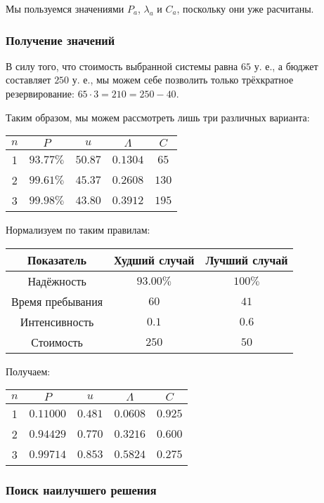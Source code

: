 \documentclass[12pt, a4paper] {ncc}
\begin{document}
Мы пользуемся значениями $P_a$, $\lambda_a$ и $C_a$, поскольку они уже
расчитаны.

\subsubsection*{Получение значений}

В силу того, что стоимость выбранной системы равна $65$ у. е., а бюджет
составляет $250$ у. е., мы можем себе позволить только трёхкратное
резервирование: $65 \cdot 3 = 210 = 250 - 40$.

Таким образом, мы можем рассмотреть лишь три различных варианта:

\begin{tabular}{|c||c|c|c|c|}
\hline
$n$ & $P$       & $u$     & $\Lambda$ & $C$   \\ \hline
\hline
1   & $93.77\%$ & $50.87$ & $0.1304$  & $65$  \\ \hline
2   & $99.61\%$ & $45.37$ & $0.2608$  & $130$ \\ \hline
3   & $99.98\%$ & $43.80$ & $0.3912$  & $195$ \\ \hline
\end{tabular}

Нормализуем по таким правилам:

\begin{tabular}{|c|c|c|}
\hline
\bf Показатель   & \bf Худший случай & \bf Лучший случай \\
\hline
Надёжность       & $93.00\%$         & $100\%$ \\
Время пребывания & $60$              & $41$    \\
Интенсивность    & $0.1$             & $0.6$   \\
Стоимость        & $250$             & $50$    \\
\hline
\end{tabular}

Получаем:

\begin{tabular}{|c||c|c|c|c|}
\hline
$n$ & $P$       & $u$     & $\Lambda$ & $C$     \\ \hline
\hline
1   & $0.11000$ & $0.481$ & $0.0608$  & $0.925$ \\ \hline
2   & $0.94429$ & $0.770$ & $0.3216$  & $0.600$ \\ \hline
3   & $0.99714$ & $0.853$ & $0.5824$  & $0.275$ \\ \hline
\end{tabular}

\subsubsection*{Поиск наилучшего решения}
\end{document}
